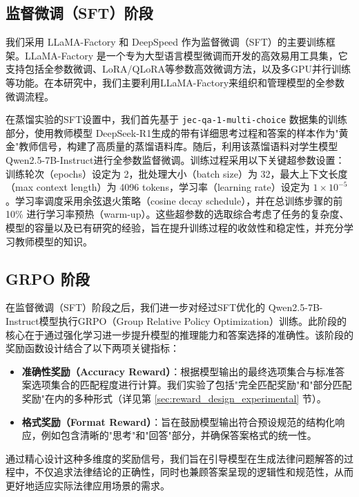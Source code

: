 \documentclass{pkuthesis}
\newcommand{\qwen}{Qwen2.5-7B-Instruct}
\newcommand{\deepseekr}{DeepSeek-R1}
\begin{document}
\subsection{监督微调（SFT）阶段}

我们采用 LLaMA-Factory 和 DeepSpeed 作为监督微调（SFT）的主要训练框架。LLaMA-Factory 是一个专为大型语言模型微调而开发的高效易用工具集，它支持包括全参数微调、LoRA/QLoRA等参数高效微调方法，以及多GPU并行训练等功能\cite{llamafactory}。在本研究中，我们主要利用LLaMA-Factory来组织和管理模型的全参数微调流程。

在蒸馏实验的SFT设置中，我们首先基于 \texttt{jec-qa-1-multi-choice} 数据集的训练部分，使用教师模型 \deepseekr 生成的带有详细思考过程和答案的样本作为"黄金"教师信号，构建了高质量的蒸馏语料库。随后，利用该蒸馏语料对学生模型 \qwen 进行全参数监督微调。训练过程采用以下关键超参数设置：训练轮次（epochs）设定为 2，批处理大小（batch size）为 32，最大上下文长度（max context length）为 4096 tokens，学习率（learning rate）设定为 $1 \times 10^{-5}$。学习率调度采用余弦退火策略（cosine decay schedule），并在总训练步骤的前 10\% 进行学习率预热（warm-up）。这些超参数的选取综合考虑了任务的复杂度、模型的容量以及已有研究的经验，旨在提升训练过程的收敛性和稳定性，并充分学习教师模型的知识。

\subsection{GRPO 阶段}

在监督微调（SFT）阶段之后，我们进一步对经过SFT优化的 \qwen 模型执行GRPO（Group Relative Policy Optimization）训练。此阶段的核心在于通过强化学习进一步提升模型的推理能力和答案选择的准确性。该阶段的奖励函数设计结合了以下两项关键指标：
\begin{itemize}
\item \textbf{准确性奖励（Accuracy Reward）}：根据模型输出的最终选项集合与标准答案选项集合的匹配程度进行计算。我们实验了包括"完全匹配奖励"和"部分匹配奖励"在内的多种形式（详见第 \ref{sec:reward_design_experimental} 节）。
\item \textbf{格式奖励（Format Reward）}：旨在鼓励模型输出符合预设规范的结构化响应，例如包含清晰的"思考"和"回答"部分，并确保答案格式的统一性。
\end{itemize}
通过精心设计这种多维度的奖励信号，我们旨在引导模型在生成法律问题解答的过程中，不仅追求法律结论的正确性，同时也兼顾答案呈现的逻辑性和规范性，从而更好地适应实际法律应用场景的需求。
\end{document}

